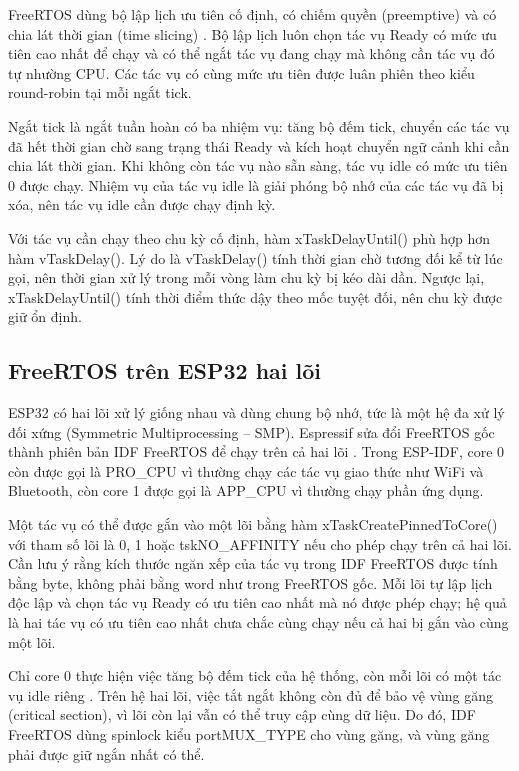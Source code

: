 FreeRTOS dùng bộ lập lịch ưu tiên cố định, có chiếm quyền (preemptive) và có chia lát thời gian (time slicing) \citep{espressif_freertos_idf}. Bộ lập lịch luôn chọn tác vụ Ready có mức ưu tiên cao nhất để chạy và có thể ngắt tác vụ đang chạy mà không cần tác vụ đó tự nhường CPU. Các tác vụ có cùng mức ưu tiên được luân phiên theo kiểu round-robin tại mỗi ngắt tick.

Ngắt tick là ngắt tuần hoàn có ba nhiệm vụ: tăng bộ đếm tick, chuyển các tác vụ đã hết thời gian chờ sang trạng thái Ready và kích hoạt chuyển ngữ cảnh khi cần chia lát thời gian. Khi không còn tác vụ nào sẵn sàng, tác vụ idle có mức ưu tiên 0 được chạy. Nhiệm vụ của tác vụ idle là giải phóng bộ nhớ của các tác vụ đã bị xóa, nên tác vụ idle cần được chạy định kỳ.

Với tác vụ cần chạy theo chu kỳ cố định, hàm xTaskDelayUntil() phù hợp hơn hàm vTaskDelay(). Lý do là vTaskDelay() tính thời gian chờ tương đối kể từ lúc gọi, nên thời gian xử lý trong mỗi vòng làm chu kỳ bị kéo dài dần. Ngược lại, xTaskDelayUntil() tính thời điểm thức dậy theo mốc tuyệt đối, nên chu kỳ được giữ ổn định.


\subsection{FreeRTOS trên ESP32 hai lõi}

ESP32 có hai lõi xử lý giống nhau và dùng chung bộ nhớ, tức là một hệ đa xử lý đối xứng (Symmetric Multiprocessing – SMP). Espressif sửa đổi FreeRTOS gốc thành phiên bản IDF FreeRTOS để chạy trên cả hai lõi \citep{espressif_freertos_idf}. Trong ESP-IDF, core 0 còn được gọi là PRO\_CPU vì thường chạy các tác vụ giao thức như WiFi và Bluetooth, còn core 1 được gọi là APP\_CPU vì thường chạy phần ứng dụng.

Một tác vụ có thể được gắn vào một lõi bằng hàm xTaskCreatePinnedToCore() với tham số lõi là 0, 1 hoặc tskNO\_AFFINITY nếu cho phép chạy trên cả hai lõi. Cần lưu ý rằng kích thước ngăn xếp của tác vụ trong IDF FreeRTOS được tính bằng byte, không phải bằng word như trong FreeRTOS gốc. Mỗi lõi tự lập lịch độc lập và chọn tác vụ Ready có ưu tiên cao nhất mà nó được phép chạy; hệ quả là hai tác vụ có ưu tiên cao nhất chưa chắc cùng chạy nếu cả hai bị gắn vào cùng một lõi.

Chỉ core 0 thực hiện việc tăng bộ đếm tick của hệ thống, còn mỗi lõi có một tác vụ idle riêng \citep{espressif_freertos_idf}. Trên hệ hai lõi, việc tắt ngắt không còn đủ để bảo vệ vùng găng (critical section), vì lõi còn lại vẫn có thể truy cập cùng dữ liệu. Do đó, IDF FreeRTOS dùng spinlock kiểu portMUX\_TYPE cho vùng găng, và vùng găng phải được giữ ngắn nhất có thể.


